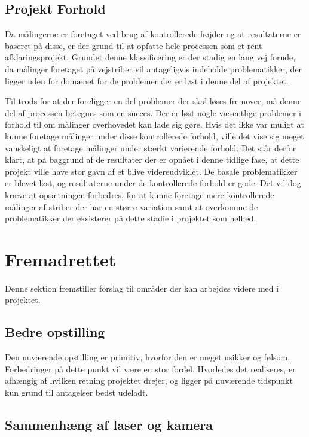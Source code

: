 \subsection{Projekt Forhold}
Da målingerne er foretaget ved brug af kontrollerede højder og at resultaterne er baseret på disse, er der grund til at opfatte hele processen som et rent afklaringsprojekt.
Grundet denne klassificering er der stadig en lang vej forude, da målinger foretaget på vejstriber vil antageligvis indeholde problematikker, der ligger uden for domænet for de problemer der er løst i denne del af projektet. 

Til trods for at der foreligger en del problemer der skal løses fremover, må denne del af processen betegnes som en succes.
Der er løst nogle væsentlige problemer i forhold til om målinger overhovedet kan lade sig gøre. Hvis det ikke var muligt at kunne foretage målinger under disse kontrollerede forhold, ville det vise sig meget vanskeligt at foretage målinger under stærkt varierende forhold.
Det står derfor klart, at på baggrund af de resultater der er opnået i denne tidlige fase, at dette projekt ville have stor gavn af et blive videreudviklet. De basale problematikker er blevet løst, og resultaterne under de kontrollerede forhold er gode. Det vil dog kræve at opsætningen forbedres, for at kunne foretage mere kontrollerede målinger af striber der har en større variation samt at overkomme de problematikker der eksisterer på dette stadie i projektet som helhed.

\newpage

\section{Fremadrettet}

Denne sektion fremstiller forslag til områder der kan arbejdes videre med i projektet.

\subsection{Bedre opstilling}

Den nuværende opstilling er primitiv, hvorfor den er meget usikker og følsom. Forbedringer på dette punkt vil være en stor fordel. Hvorledes det realiseres, er afhængig af hvilken retning projektet drejer, og ligger på nuværende tidspunkt kun grund til antagelser bedst udeladt.

\subsection{Sammenhæng af laser og kamera}

